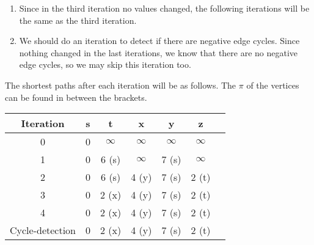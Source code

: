 \documentclass{article}
\begin{document}
\begin{enumerate}
\begin{enumerate}[label=(\roman*)]
        \end{enumerate}
    \item Since in the third iteration no values changed, the following iterations will be the same as the third iteration.
    \item We should do an iteration to detect if there are negative edge cycles. Since nothing changed in the last iterations, we know that there are no negative edge cycles, so we may skip this iteration too.
\end{enumerate}

The shortest paths after each iteration will be as follows. The $\pi$ of the vertices can be found in between the brackets.
\begin{table}[ht]
\centering
\begin{tabular}{|c||c|c|c|c|c|c|}
\hline
Iteration   & s       & t         & x        & y         & z          \\ \hline\hline
0           & 0       & $\infty$  & $\infty$ & $\infty$  & $\infty$   \\ \hline
1           & 0       & 6 (s)     & $\infty$ & 7 (s)     & $\infty$   \\ \hline
2           & 0       & 6 (s)     & 4 (y)    & 7 (s)     & 2 (t)      \\ \hline
3           & 0       & 2 (x)     & 4 (y)    & 7 (s)     & 2 (t)      \\ \hline
4           & 0       & 2 (x)     & 4 (y)    & 7 (s)     & 2 (t)      \\ \hline
Cycle-detection & 0   & 2 (x)     & 4 (y)    & 7 (s)     & 2 (t)      \\ \hline
\end{tabular}
\end{table}



\end{document}
